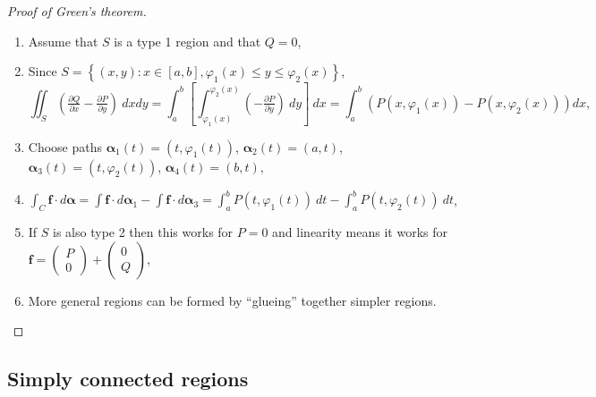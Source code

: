 \documentclass[aspectratio=169,handout]{beamer}
\newcommand{\ff}{\mathbf{f}}
\newcommand{\aalpha}{\boldsymbol{\alpha}}
\begin{document}
\begin{frame}
    \frametitle{}


    \begin{proof}[Proof of Green's theorem]
        \begin{enumerate}
            \item Assume that \(S\) is a type 1 region and that \(Q=0\),
            \item Since \(S = \left\{(x,y): x \in [a,b], \varphi_1(x) \leq y \leq \varphi_2(x)\right\}\),
            \[
                \iint_{S}  \left(\tfrac{\partial Q}{\partial x} - \tfrac{\partial P}{\partial y}\right) \ dxdy = 
                \int_{a}^{b}\left[\int_{\varphi_1(x)}^{\varphi_2(x)}  (- \tfrac{\partial P}{\partial y}) \ dy\right] \ dx
                = \int_{a}^{b}  (P(x,\varphi_1(x))-P(x,\varphi_2(x)))   dx,
            \]
            \item Choose paths \(\aalpha_1(t) = (t,\varphi_1(t))\), \(\aalpha_2(t) = (a,t)\), \(\aalpha_3(t) = (t,\varphi_2(t))\), \(\aalpha_4(t) = (b,t)\),
            \item \(\int_{C} \ff \cdot d\aalpha = \int \ff \cdot d\aalpha_1 - \int \ff \cdot d\aalpha_3 = \int_{a}^{b} P(t,\varphi_1(t)) \ dt -  \int_{a}^{b} P(t,\varphi_2(t)) \ dt \),
            \item If \(S\) is also type 2 then this works for \(P=0\) and linearity means it works for \(\ff = \left(\begin{smallmatrix}
                P \\ 0
            \end{smallmatrix}\right)+\left(\begin{smallmatrix}
                0 \\ Q
            \end{smallmatrix}\right)\),
            \item More general regions can be formed by ``glueing'' together simpler regions.
        \end{enumerate}
    \end{proof}
    

\end{frame}

\subsection{Simply connected regions}
\end{document}
